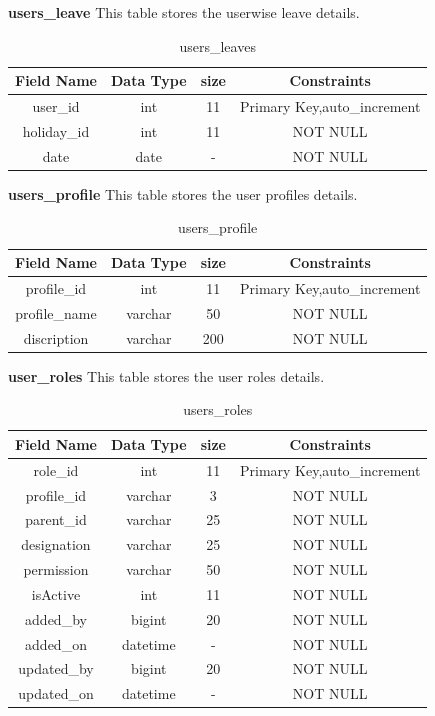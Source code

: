 \textbf{users\_leave} This table stores the userwise leave details.\nolinebreak
\begin{table}[hp]
\centering
\begin{tabular}{|c|c|c|c|}
\hline
\textbf{Field Name}  & \textbf{Data Type}  & \textbf{size} &\textbf{Constraints}  \\
\hline
user\_id &	int &	11 &  Primary Key,auto\_increment \\\hline
holiday\_id &	int &	11 & NOT NULL \\\hline
date & date &	- & NOT NULL \\\hline

\end{tabular}
\caption{users\_leaves}
\end{table}

\textbf{users\_profile} This table stores the user profiles details.\nolinebreak
\begin{table}[hp]
\centering
\begin{tabular}{|c|c|c|c|}
\hline
\textbf{Field Name}  & \textbf{Data Type}  & \textbf{size} &\textbf{Constraints}  \\
\hline
profile\_id &	int &	11 &  Primary Key,auto\_increment \\\hline
profile\_name &	varchar &	50 & NOT NULL \\\hline
discription  & varchar &	200 & NOT NULL \\\hline

\end{tabular}
\caption{users\_profile}
\end{table}

\pagebreak

\textbf{user\_roles} This table stores the user roles details.\nolinebreak
\begin{table}[hp]
\centering
\begin{tabular}{|c|c|c|c|}
\hline
\textbf{Field Name}  & \textbf{Data Type}  & \textbf{size} &\textbf{Constraints}  \\
\hline
role\_id &	int &	11 & Primary Key,auto\_increment \\\hline
profile\_id &	varchar &	3 & NOT NULL \\\hline
 parent\_id &	varchar &	25 & NOT NULL \\\hline
designation &	varchar &	25 & NOT NULL \\\hline
permission &	varchar &	50 & NOT NULL \\\hline
isActive &	int &	11 & NOT NULL \\\hline
added\_by	 & bigint	& 20 & NOT NULL \\\hline
added\_on	 & datetime &	- & NOT NULL \\\hline
updated\_by &	bigint &	20 & NOT NULL \\\hline
updated\_on &	datetime &	- & NOT NULL \\\hline
  

\end{tabular}
\caption{users\_roles}
\end{table}

